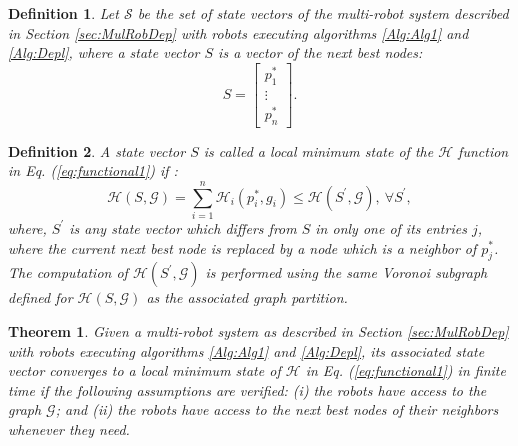 \documentclass[smallcondensed]{svjour3}
\newtheorem{mytheorem}{Theorem}
\newtheorem{mydef}{Definition}
\begin{document}
%
\begin{mydef}
Let $\mathcal S$ be the set of state vectors of the multi-robot system described in Section \ref{sec:MulRobDep} with robots executing algorithms \ref{Alg:Alg1} and \ref{Alg:Depl}, where a state vector $S$ is a vector of the next best nodes:
%
\[
S=
\begin{bmatrix}
p_1^*\\
\vdots\\
p_n^*
\end{bmatrix}.\]
\end{mydef}

\begin{mydef}
\label{def4}
A state vector $S$ is called a local minimum state of the $\mathcal H$ function in Eq. (\ref{eq:functional1}) if :
%
\[\mathcal H(S,\mathcal G)=\sum_{i = 1}^{n} \mathcal H_i(p_i^*,g_i) \leq \mathcal H(S^\prime,\mathcal G), ~\forall S^\prime, \]
%
where, $S^\prime$ is any state vector which differs from $S$ in only one of its entries $j$, where the current next best node is replaced by a node which is a neighbor of $p_j^*$. The computation of $\mathcal H(S^\prime, \mathcal G)$ is performed using the same Voronoi subgraph defined for $\mathcal H(S,\mathcal G)$ as the associated graph partition.
\end{mydef}

\begin{mytheorem}
Given a multi-robot system as described in Section \ref{sec:MulRobDep} with robots executing algorithms \ref{Alg:Alg1} and \ref{Alg:Depl}, its associated state vector converges to a local minimum state of $\mathcal H$ in Eq. (\ref{eq:functional1}) in finite time if the following assumptions are verified: (i) the robots have access to the graph $\mathcal G$;  and (ii) the robots have access to the next best nodes of their neighbors whenever they need.
\end{mytheorem}
\end{document}
